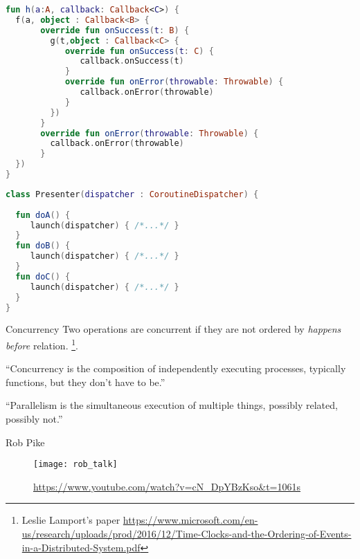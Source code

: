 \documentclass[10pt]{beamer}
\begin{document}
\begin{frame}[fragile]
\begin{lstlisting}[language=Kotlin, basicstyle=\ttfamily]
fun h(a:A, callback: Callback<C>) {
  f(a, object : Callback<B> {
       override fun onSuccess(t: B) {
         g(t,object : Callback<C> {
            override fun onSuccess(t: C) {
               callback.onSuccess(t)
            }
            override fun onError(throwable: Throwable) {
               callback.onError(throwable)
            }
         })
       }
       override fun onError(throwable: Throwable) {
         callback.onError(throwable)
       }
  })
}
\end{lstlisting}
\end{frame}


\begin{frame}[fragile]
\begin{lstlisting}[language=Kotlin, basicstyle=\ttfamily]
class Presenter(dispatcher : CoroutineDispatcher) {
  
  fun doA() {
     launch(dispatcher) { /*...*/ }
  }
  fun doB() {
     launch(dispatcher) { /*...*/ }
  }
  fun doC() {
     launch(dispatcher) { /*...*/ }
  }
}
\end{lstlisting}
\end{frame}

\begin{frame}[fragile]
\begin{alertblock}{Concurrency}
Two operations are concurrent if they are not ordered by \emph{happens before} relation.%
		\footnote{Leslie Lamport's paper \url{https://www.microsoft.com/en-us/research/uploads/prod/2016/12/Time-Clocks-and-the-Ordering-of-Events-in-a-Distributed-System.pdf}}.
\end{alertblock}
\end{frame}

\begin{frame}[fragile]
	``Concurrency is the composition of independently executing processes, typically functions, but they don't have to be.''

	``Parallelism is the simultaneous execution of multiple things, possibly related, possibly not.''

Rob Pike

\end{frame}
\begin{frame}[fragile]
	\begin{figure}
		\texttt{[image: rob\_talk]}
		\caption{\url{https://www.youtube.com/watch?v=cN_DpYBzKso&t=1061s}}
	\end{figure}
\end{frame}
\end{document}
